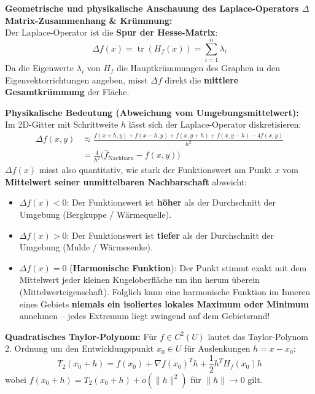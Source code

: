 \begin{remark}
    \textbf{Geometrische und physikalische Anschauung des Laplace-Operators $\Delta$}\\
    \textbf{Matrix-Zusammenhang \& Krümmung:} \\
    Der Laplace-Operator ist die \textbf{Spur der Hesse-Matrix}:
    $$ \Delta f(x) = \operatorname{tr}(H_f(x)) = \sum_{i=1}^n \lambda_i $$
    Da die Eigenwerte $\lambda_i$ von $H_f$ die Hauptkrümmungen des Graphen in den Eigenvektorrichtungen angeben, misst $\Delta f$ direkt die \textbf{mittlere Gesamtkrümmung} der Fläche.

    \textbf{Physikalische Bedeutung (Abweichung vom Umgebungsmittelwert):} \\
    Im 2D-Gitter mit Schrittweite $h$ lässt sich der Laplace-Operator diskretisieren:
    \begin{align*}
        \Delta f(x, y) &\approx \frac{f(x+h, y) + f(x-h, y) + f(x, y+h) + f(x, y-h) - 4f(x, y)}{h^2} \\
        &= \frac{4}{h^2} \big( \bar{f}_{\text{Nachbarn}} - f(x, y) \big)
    \end{align*}
    $\Delta f(x)$ misst also quantitativ, wie stark der Funktionswert am Punkt $x$ vom \textbf{Mittelwert seiner unmittelbaren Nachbarschaft} abweicht:
    \begin{itemize}
        \item $\Delta f(x) < 0$: Der Funktionswert ist \textbf{höher} als der Durchschnitt der Umgebung (Bergkuppe / Wärmequelle).
        \item $\Delta f(x) > 0$: Der Funktionswert ist \textbf{tiefer} als der Durchschnitt der Umgebung (Mulde / Wärmesenke).
        \item $\Delta f(x) = 0$ (\textbf{Harmonische Funktion}): Der Punkt stimmt exakt mit dem Mittelwert jeder kleinen Kugeloberfläche um ihn herum überein (Mittelwerteigenschaft). Folglich kann eine harmonische Funktion im Inneren eines Gebiets \textbf{niemals ein isoliertes lokales Maximum oder Minimum} annehmen – jedes Extremum liegt zwingend auf dem Gebietsrand!
    \end{itemize}
\end{remark}

\begin{theorem}
    \textbf{Quadratisches Taylor-Polynom:} Für $f \in C^2(U)$ lautet das Taylor-Polynom 2. Ordnung um den Entwicklungspunkt $x_0 \in U$ für Auslenkungen $h = x - x_0$:
    $$ T_2(x_0 + h) = f(x_0) + \nabla f(x_0)^T h + \frac{1}{2} h^T H_f(x_0) h $$
    wobei $f(x_0 + h) = T_2(x_0 + h) + o(\|h\|^2)$ für $\|h\| \to 0$ gilt.
\end{theorem}

